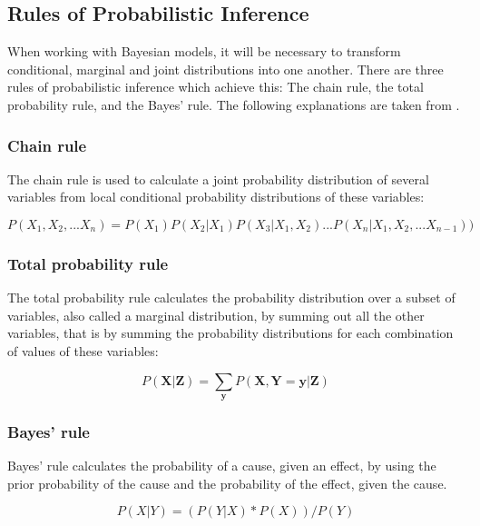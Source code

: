 \documentclass{article}
\begin{document}
\subsection{Rules of Probabilistic Inference}

When working with Bayesian models, it will be necessary to transform conditional, marginal and joint distributions into one another. There are three rules of probabilistic inference which achieve this: The chain rule, the total probability rule, and the Bayes' rule. The following explanations are taken from \cite{9781617292330}.

\subsubsection{Chain rule}

The chain rule is used to calculate a \gls{joint probability distribution} of several variables from local \gls{conditional probability distribution}s of these variables:

\begin{equation}
P(X_1 ,X_2 ,...X_n ) = P(X_1 )P(X_2 | X_1 )P(X_3 | X_1 ,X_2 )...P(X_n | X_1 ,X_2 ,...X_{n-1}) )
\end{equation}

\subsubsection{Total probability rule}

The total probability rule calculates the probability distribution over a subset of variables, also called a \gls{marginal distribution}, by summing out all the other variables, that is by summing the probability distributions for each combination of values of these variables:

\begin{equation}
P(\boldsymbol X |\boldsymbol Z ) = \sum_{\boldsymbol y}   P(\boldsymbol X ,\boldsymbol Y =\boldsymbol y |\boldsymbol Z )
\end{equation} 

\subsubsection{Bayes' rule}

Bayes' rule calculates the probability of a cause, given an effect, by using the prior probability of the cause and the probability of the effect, given the cause. 

\begin{equation}
P(X|Y) = ( P(Y|X) * P(X) ) / P(Y)
\end{equation}
\end{document}
